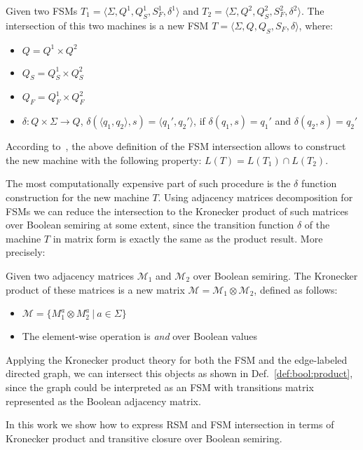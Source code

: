 \begin{definition}
\label{def:fsm:intersection}
Given two FSMs $T_1 = \langle \Sigma, Q^1, Q_S^1, S_F^1, \delta^1 \rangle$ and $T_2 = \langle \Sigma, Q^2, Q_S^2, S_F^2, \delta^2 \rangle$. The intersection of this two machines is a new FSM $T = \langle \Sigma, Q, Q_S, S_F, \delta \rangle$, where:
\begin{itemize}
    \item $Q = Q^1 \times Q^2$
    \item $Q_S = Q_S^1 \times Q_S^2$
    \item $Q_F = Q_F^1 \times Q_F^2$
    \item $\delta: Q \times \Sigma \to Q$, 
    $\delta (\langle q_1, q_2 \rangle, s) = \langle q_1', q_2' \rangle$, 
    \newline if $\delta(q_1,s)=q_1'$ and $\delta(q_2,s)=q_2'$
\end{itemize}
\end{definition}

According to~\cite{automata:theory:10.5555/1177300}, the above definition of the FSM intersection allows to construct the new machine with the following property: $L(T) = L(T_1) \cap L(T_2)$. 

The most computationally expensive part of such procedure is the $\delta$ function construction for the new machine $T$. Using adjacency matrices decomposition for FSMs we can reduce the intersection to the Kronecker product of such matrices over Boolean semiring at some extent, since the transition function $\delta$ of the machine $T$ in matrix form is exactly the same as the product result. More precisely:

\begin{definition}
\label{def:bool:product}
Given two adjacency matrices $\mathcal{M}_1$ and $\mathcal{M}_2$ over Boolean semiring. 
The Kronecker product of these matrices is a new matrix 
$\mathcal{M} = \mathcal{M}_1 \otimes \mathcal{M}_2$, defined as follows:
\begin{itemize}
    \item $\mathcal{M} = \{ M_1^a \otimes M_2^a~|~a \in \Sigma \}$
    \item The element-wise operation is \textit{and} over Boolean values
\end{itemize}
\end{definition}

Applying the Kronecker product theory for both the FSM and the edge-labeled directed graph,
we can intersect this objects as shown in Def.~\ref{def:bool:product}, since the 
graph could be interpreted as an FSM with transitions matrix represented as 
the Boolean adjacency matrix.

In this work we show how to express RSM and FSM intersection in terms of 
Kronecker product and transitive closure over Boolean semiring.